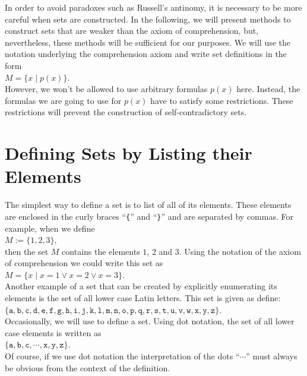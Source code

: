 In order to avoid paradoxes such as Russell's antinomy, it is necessary to be more careful when sets are
constructed.  In the following, we will present methods to construct sets that are weaker than the 
axiom of comprehension, but, nevertheless, these methods will be sufficient for our purposes.  We will use the
notation underlying the comprehension axiom and write set definitions in the form
\\[0.2cm]
\hspace*{1.3cm}
$M = \{ x \mid p(x) \}$.  
\\[0.2cm]
However, we won't be allowed to use arbitrary formulas $p(x)$ here.  Instead, the formulas we are going to use
for $p(x)$ have to satisfy some restrictions.  These restrictions will prevent the construction of
self-contradictory sets.

\section{Defining Sets by Listing their Elements}
The simplest way to define a set is to list of all of its elements. These elements are enclosed in the
curly braces  ``\texttt{\{}'' and ``\texttt{\}}'' and are separated by commas.
For example, when we define \\[0.2cm]
\hspace*{1.3cm} $M := \{ 1, 2, 3 \}$, \\[0.2cm]
then the set $M$ contains the elements $1$, $2$ and $3$.
Using  the notation of the axiom of comprehension we could write this set as \\[0.2cm]
\hspace*{1.3cm} 
$M = \{ x \mid x = 1 \vee x = 2 \vee x = 3 \}$.
\\[0.2cm]
Another example of a set that can be created by explicitly enumerating its elements
is the set of all lower case Latin letters.  This set is given as
define: \\[0.2cm]
\hspace*{1.3cm} 
$\{\mathtt{a}, \mathtt{b}, \mathtt{c}, \mathtt{d}, \mathtt{e},
 \mathtt{f}, \mathtt{g}, \mathtt{h}, \mathtt{i}, \mathtt{j}, \mathtt{k}, \mathtt{l},
 \mathtt{m}, \mathtt{n}, \mathtt{o}, \mathtt{p}, \mathtt{q}, \mathtt{r}, \mathtt{s},
 \mathtt{t}, \mathtt{u}, \mathtt{v}, \mathtt{w}, \mathtt{x}, \mathtt{y}, \mathtt{z}\}$.
 \\[0.2cm]
Occasionally, we will use  to define a set.  Using dot notation, the set of all lower case
elements is written as
\\[0.2cm]
\hspace*{1.3cm}
$\{ \mathtt{a}, \mathtt{b}, \mathtt{c}, \cdots, \mathtt{x}, \mathtt{y}, \mathtt{z}\} $.
\\[0.2cm]
Of course, if we use dot notation the interpretation of the dots ``$\cdots$'' must always be obvious from the
context of the definition. 

